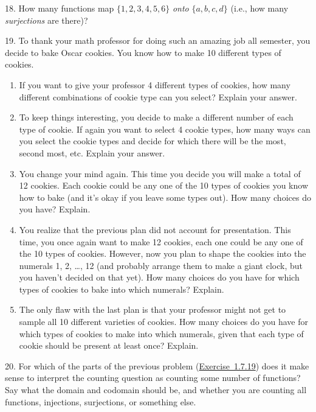 \documentclass[10pt,]{book}
\theoremstyle{plain}
\theoremstyle{definition}
\numberwithin{equation}{chapter}
\begin{document}
\begin{exerciselist}
\par\smallskip
\item[18.]\hypertarget{exercise-137}{}
            How many functions map \(\{1,2,3,4,5,6\}\) \emph{onto} \(\{a,b,c,d\}\) (i.e., how many \emph{surjections} are there)?
\par\smallskip
\item[19.]\hypertarget{exr_cookie-counting}{}
            To thank your math professor for doing such an amazing job all semester, you decide to bake Oscar cookies. You know how to make 10 different types of cookies.
          \leavevmode%
\begin{enumerate}[label=(\alph*)]
\item\hypertarget{li-468}{}
                If you want to give your professor 4 different types of cookies, how many different combinations of cookie type can you select? Explain your answer.
\item\hypertarget{li-469}{}
                To keep things interesting, you decide to make a different number of each type of cookie. If again you want to select 4 cookie types, how many ways can you select the cookie types and decide for which there will be the most, second most, etc. Explain your answer.
\item\hypertarget{li-470}{}
                You change your mind again. This time you decide you will make a total of 12 cookies. Each cookie could be any one of the 10 types of cookies you know how to bake (and it's okay if you leave some types out). How many choices do you have? Explain.
\item\hypertarget{li-471}{}
                You realize that the previous plan did not account for presentation. This time, you once again want to make 12 cookies, each one could be any one of the 10 types of cookies. However, now you plan to shape the cookies into the numerals 1, 2,
                \dots{}, 12 (and probably arrange them to make a giant clock, but you haven't decided on that yet). How many choices do you have for which types of cookies to bake into which numerals? Explain.
\item\hypertarget{li-472}{}
                The only flaw with the last plan is that your professor might not get to sample all 10 different varieties of cookies. How many choices do you have for which types of cookies to make into which numerals, given that each type of cookie should be present at least once? Explain.
\end{enumerate}

\par\smallskip
\item[20.]\hypertarget{exercise-139}{}
            For which of the parts of the previous problem (\hyperlink{exr_cookie-counting}{Exercise~1.7.19}) does it make sense to interpret the counting question as counting some number of functions? Say what the domain and codomain should be, and whether you are counting all functions, injections, surjections, or something else.
\par\smallskip
\end{exerciselist}
\end{document}

